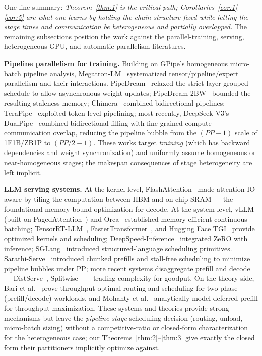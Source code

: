 \documentclass[11pt]{article}
\begin{document}
One-line summary: \emph{Theorem~\ref{thm:1} is the critical path; Corollaries~\ref{cor:1}--\ref{cor:5} are what one learns by holding the chain structure fixed while letting the stage times and communication be heterogeneous and partially overlapped.} The remaining subsections position the work against the parallel-training, serving, heterogeneous-GPU, and automatic-parallelism literatures.

\textbf{Pipeline parallelism for training.} Building on GPipe's homogeneous micro-batch pipeline analysis, Megatron-LM~\cite{r6} systematized tensor/pipeline/expert parallelism and their interactions. PipeDream~\cite{r7} relaxed the strict layer-grouped schedule to allow asynchronous weight updates; PipeDream-2BW~\cite{r8} bounded the resulting staleness memory; Chimera~\cite{r9} combined bidirectional pipelines; TeraPipe~\cite{r10} exploited token-level pipelining; most recently, DeepSeek-V3's DualPipe~\cite{r11} combined bidirectional filling with fine-grained compute--communication overlap, reducing the pipeline bubble from the $(PP-1)$ scale of 1F1B/ZB1P to $(PP/2-1)$. These works target \emph{training} (which has backward dependencies and weight synchronization) and uniformly assume homogeneous or near-homogeneous stages; the makespan consequences of stage heterogeneity are left implicit.

\textbf{LLM serving systems.} At the kernel level, FlashAttention~\cite{r12} made attention IO-aware by tiling the computation between HBM and on-chip SRAM --- the foundational memory-bound optimization for decode. At the system level, vLLM (built on PagedAttention~\cite{r13}) and Orca~\cite{r14} established memory-efficient continuous batching; TensorRT-LLM~\cite{r15}, FasterTransformer~\cite{r16}, and Hugging Face TGI~\cite{r17} provide optimized kernels and scheduling; DeepSpeed-Inference~\cite{r18} integrated ZeRO with inference; SGLang~\cite{r19} introduced structured-language scheduling primitives. Sarathi-Serve~\cite{r20} introduced chunked prefills and stall-free scheduling to minimize pipeline bubbles under PP; more recent systems disaggregate prefill and decode --- DistServe~\cite{r21}, Splitwise~\cite{r22} --- trading complexity for goodput. On the theory side, Bari et al.~\cite{r23} prove throughput-optimal routing and scheduling for two-phase (prefill/decode) workloads, and Mohanty et al.~\cite{r24} analytically model deferred prefill for throughput maximization. These systems and theories provide strong mechanisms but leave the \emph{pipeline-stage} scheduling decision (routing, unload, micro-batch sizing) without a competitive-ratio or closed-form characterization for the heterogeneous case; our Theorems~\ref{thm:2}--\ref{thm:3} give exactly the closed form their partitioners implicitly optimize against.
\end{document}
